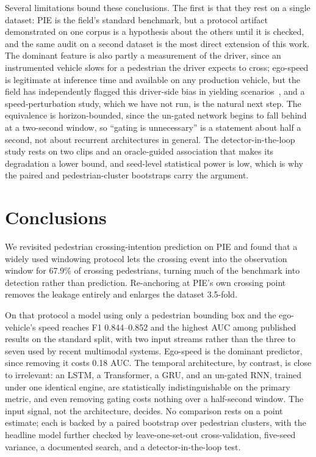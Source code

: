 \documentclass[mti,article,submit,moreauthors]{Definitions/mdpi}
\begin{document}
Several limitations bound these conclusions. The first is that they rest on a single dataset: PIE is the field's standard benchmark, but a protocol artifact demonstrated on one corpus is a hypothesis about the others until it is checked, and the same audit on a second dataset is the most direct extension of this work. The dominant feature is also partly a measurement of the driver, since an instrumented vehicle slows for a pedestrian the driver expects to cross; ego-speed is legitimate at inference time and available on any production vehicle, but the field has independently flagged this driver-side bias in yielding scenarios~\citep{azarmi2024featureimportance}, and a speed-perturbation study, which we have not run, is the natural next step. The equivalence is horizon-bounded, since the un-gated network begins to fall behind at a two-second window, so ``gating is unnecessary'' is a statement about half a second, not about recurrent architectures in general. The detector-in-the-loop study rests on two clips and an oracle-guided association that makes its degradation a lower bound, and seed-level statistical power is low, which is why the paired and pedestrian-cluster bootstraps carry the argument.

\section{Conclusions}
\label{sec:conclusions}

We revisited pedestrian crossing-intention prediction on PIE and found that a widely used windowing protocol lets the crossing event into the observation window for 67.9\% of crossing pedestrians, turning much of the benchmark into detection rather than prediction. Re-anchoring at PIE's own crossing point removes the leakage entirely and enlarges the dataset 3.5-fold.

On that protocol a model using only a pedestrian bounding box and the ego-vehicle's speed reaches F1 0.844--0.852 and the highest AUC among published results on the standard split, with two input streams rather than the three to seven used by recent multimodal systems. Ego-speed is the dominant predictor, since removing it costs 0.18 AUC. The temporal architecture, by contrast, is close to irrelevant: an LSTM, a Transformer, a GRU, and an un-gated RNN, trained under one identical engine, are statistically indistinguishable on the primary metric, and even removing gating costs nothing over a half-second window. The input signal, not the architecture, decides. No comparison rests on a point estimate; each is backed by a paired bootstrap over pedestrian clusters, with the headline model further checked by leave-one-set-out cross-validation, five-seed variance, a documented search, and a detector-in-the-loop test.
\end{document}
